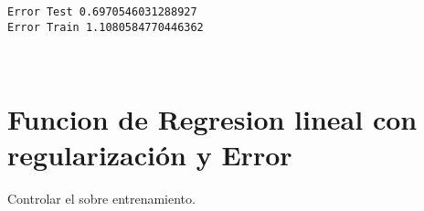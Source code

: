 \documentclass[11pt]{article}
\begin{document}
    \begin{Verbatim}[commandchars=\\\{\}]
Error Test 0.6970546031288927
Error Train 1.1080584770446362

    \end{Verbatim}

    \begin{center}
    \end{center}
    { \hspace*{\fill} \\}
    
    \section{Funcion de Regresion lineal con regularización y
Error}\label{funcion-de-regresion-lineal-con-regularizaciuxf3n-y-error}

Controlar el sobre entrenamiento.
\end{document}
